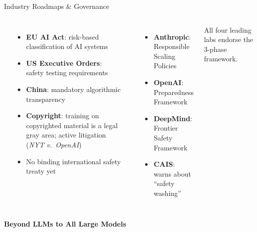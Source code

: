 \begin{frame}{Industry Roadmaps \& Governance}
\begin{columns}[T]
    {\small\bfseries{}}
    \begin{itemize}\scriptsize\setlength\itemsep{2pt}
      \item \textbf{EU AI Act}: risk-based classification of AI systems
      \item \textbf{US Executive Orders}: safety testing requirements
      \item \textbf{China}: mandatory algorithmic transparency
      \item \textbf{Copyright}: training on copyrighted material is a legal gray area; active litigation (\emph{NYT v.\ OpenAI})
      \item No binding international safety treaty yet
    \end{itemize}
    \vspace{0.3em}
    {\small\bfseries{}}
    \begin{itemize}\scriptsize\setlength\itemsep{2pt}
      \item \textbf{Anthropic}: Responsible Scaling Policies
      \item \textbf{OpenAI}: Preparedness Framework
      \item \textbf{DeepMind}: Frontier Safety Framework
      \item \textbf{CAIS}: warns about ``safety washing''
    \end{itemize}
    \vspace{0.3em}
    \begin{ucrinfo}
      \centering\scriptsize
      All four leading labs endorse the 3-phase framework.
    \end{ucrinfo}
  \end{columns}
\end{frame}

\fi


\begin{frame}
  \centering\vspace{2cm}
  {\Huge\bfseries\color{UCRnavy} Beyond LLMs to All Large Models}
\end{frame}


